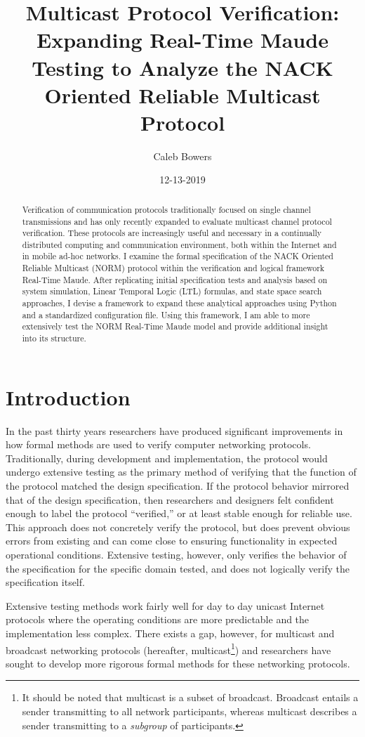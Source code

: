\documentclass[10pt, journal]{IEEEtran}
\title{Multicast Protocol Verification: Expanding Real-Time Maude Testing to Analyze the NACK Oriented Reliable Multicast Protocol}
\author{Caleb Bowers}
\date{12-13-2019}
\begin{document}
\maketitle
\begin{abstract}
Verification of communication protocols traditionally focused on single channel transmissions and has only recently expanded to evaluate multicast channel protocol verification. These protocols are increasingly useful and necessary in a continually distributed computing and communication environment, both within the Internet and in mobile ad-hoc networks. I examine the formal specification of the NACK Oriented Reliable Multicast (NORM) protocol within the verification and logical framework Real-Time Maude. After replicating initial specification tests and analysis based on system simulation, Linear Temporal Logic (LTL) formulas, and state space search approaches, I devise a framework to expand these analytical approaches using Python and a standardized configuration file. Using this framework, I am able to more extensively test the NORM Real-Time Maude model and provide additional insight into its structure. 
\end{abstract}

\section{Introduction}
In the past thirty years researchers have produced significant improvements in how formal methods are used to verify computer networking protocols. Traditionally, during development and implementation, the protocol would undergo extensive testing as the primary method of verifying that the function of the protocol matched the design specification. If the protocol behavior mirrored that of the design specification, then researchers and designers felt confident enough to label the protocol ``verified,'' or at least stable enough for reliable use. This approach does not concretely verify the protocol, but does prevent obvious errors from existing and can come close to ensuring functionality in expected operational conditions. Extensive testing, however, only verifies the behavior of the specification for the specific domain tested, and does not logically verify the specification itself.

Extensive testing methods work fairly well for day to day unicast Internet protocols where the operating conditions are more predictable and the implementation less complex. There exists a gap, however, for multicast and broadcast networking protocols (hereafter, multicast\footnote{It should be noted that multicast is a subset of broadcast. Broadcast entails a sender transmitting to all network participants, whereas multicast describes a sender transmitting to a \textit{subgroup} of participants.}) and researchers have sought to develop more rigorous formal methods for these networking protocols. 
\end{document}
